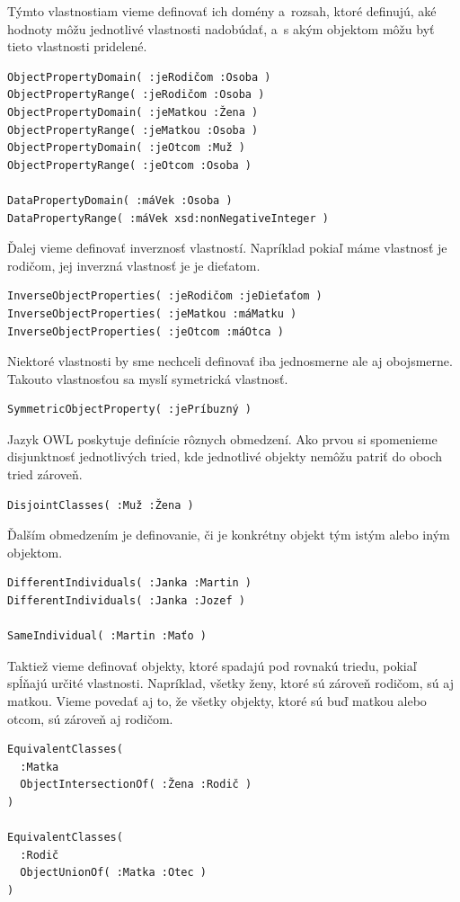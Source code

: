 \documentclass[12pt, a4paper, oneside]{book}
\begin{document}


Týmto vlastnostiam vieme definovať ich domény a~rozsah, ktoré definujú, aké hodnoty môžu jednotlivé vlastnosti nadobúdať, a~s akým objektom môžu byť tieto vlastnosti pridelené.
\begin{verbatim}
ObjectPropertyDomain( :jeRodičom :Osoba )
ObjectPropertyRange( :jeRodičom :Osoba )
ObjectPropertyDomain( :jeMatkou :Žena )
ObjectPropertyRange( :jeMatkou :Osoba )
ObjectPropertyDomain( :jeOtcom :Muž )
ObjectPropertyRange( :jeOtcom :Osoba )

DataPropertyDomain( :máVek :Osoba ) 
DataPropertyRange( :máVek xsd:nonNegativeInteger ) 
\end{verbatim}


Ďalej vieme definovať inverznosť vlastností. Napríklad pokiaľ máme vlastnosť je rodičom, jej inverzná vlastnosť je je dieťatom.
\begin{verbatim}
InverseObjectProperties( :jeRodičom :jeDieťaťom )
InverseObjectProperties( :jeMatkou :máMatku )
InverseObjectProperties( :jeOtcom :máOtca )
\end{verbatim}


Niektoré vlastnosti by sme nechceli definovať iba jednosmerne ale aj obojsmerne. Takouto vlastnosťou sa myslí symetrická vlastnosť.
\begin{verbatim}
SymmetricObjectProperty( :jePríbuzný )
\end{verbatim}


Jazyk OWL poskytuje definície rôznych obmedzení. Ako prvou si spomenieme disjunktnosť jednotlivých tried, kde jednotlivé objekty nemôžu patriť do oboch tried zároveň.
\begin{verbatim}
DisjointClasses( :Muž :Žena )
\end{verbatim}


Ďalším obmedzením je definovanie, či je konkrétny objekt tým istým alebo iným objektom.
\begin{verbatim}
DifferentIndividuals( :Janka :Martin )
DifferentIndividuals( :Janka :Jozef )

SameIndividual( :Martin :Maťo )
\end{verbatim}


Taktiež vieme definovať objekty, ktoré spadajú pod rovnakú triedu, pokiaľ spĺňajú určité vlastnosti. Napríklad, všetky ženy, ktoré sú zároveň rodičom, sú aj matkou. Vieme povedať aj to, že všetky objekty, ktoré sú buď matkou alebo otcom, sú zároveň aj rodičom.
\begin{verbatim}
EquivalentClasses(
  :Matka 
  ObjectIntersectionOf( :Žena :Rodič )
) 

EquivalentClasses(
  :Rodič 
  ObjectUnionOf( :Matka :Otec )
) 
\end{verbatim}
\end{document}
